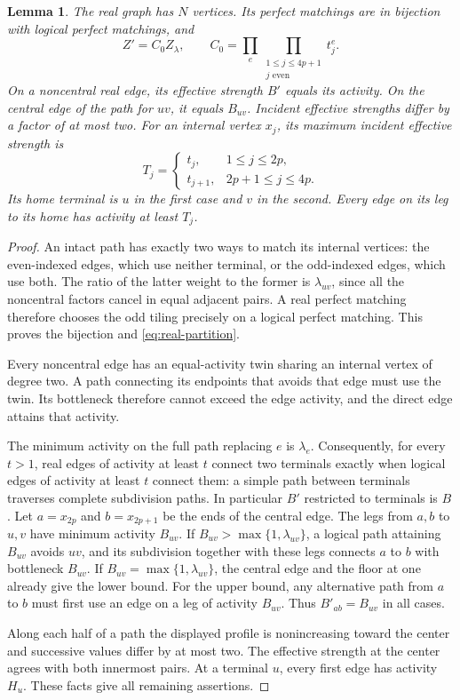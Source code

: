 \documentclass[11pt]{article}
\newtheorem{lemma}[theorem]{Lemma}
\theoremstyle{definition}
\theoremstyle{remark}
\numberwithin{equation}{section}
\begin{document}
\begin{lemma}\label{lem:subdivision}
The real graph has $N$ vertices. Its perfect matchings are in
bijection with logical perfect matchings, and
\begin{equation}\label{eq:real-partition}
 Z'=C_0 Z_\lambda,
 \qquad
 C_0=\prod_e\prod_{\substack{1\le j\le4p+1\\j\text{ even}}}t_j^e.
\end{equation}
On a noncentral real edge, its effective strength $B'$ equals its
activity. On the central edge of the path for $uv$, it equals
$B_{uv}$. Incident effective strengths differ by a factor of at most
two. For an internal vertex $x_j$, its maximum incident effective
strength is
\[
 T_j=
 \begin{cases}
 t_j,&1\le j\le2p,\\
 t_{j+1},&2p+1\le j\le4p.
 \end{cases}
\]
Its \emph{home terminal} is $u$ in the first case and $v$ in the
second. Every edge on its leg to its home has activity at least $T_j$.
\end{lemma}

\begin{proof}
An intact path has exactly two ways to match its internal vertices:
the even-indexed edges, which use neither terminal, or the
odd-indexed edges, which use both. The ratio of the latter weight to
the former is $\lambda_{uv}$, since all the noncentral factors cancel
in equal adjacent pairs. A real perfect matching therefore chooses
the odd tiling precisely on a logical perfect matching. This proves
the bijection and \cref{eq:real-partition}.

Every noncentral edge has an equal-activity twin sharing an internal
vertex of degree two. A path connecting its endpoints that avoids
that edge must use the twin. Its bottleneck therefore cannot exceed
the edge activity, and the direct edge attains that activity.

The minimum activity on the full path replacing $e$ is $\lambda_e$.
Consequently, for every $t>1$, real edges of activity at least $t$
connect two terminals exactly when logical edges of activity at least
$t$ connect them: a simple path between terminals traverses complete
subdivision paths. In particular $B'$ restricted to terminals is $B$.
Let $a=x_{2p}$ and $b=x_{2p+1}$ be the ends of the central edge.
The legs from $a,b$ to $u,v$ have minimum activity $B_{uv}$.
If $B_{uv}>\max\{1,\lambda_{uv}\}$, a logical path attaining
$B_{uv}$ avoids $uv$, and its subdivision together with these legs
connects $a$ to $b$ with bottleneck $B_{uv}$. If
$B_{uv}=\max\{1,\lambda_{uv}\}$, the central edge and the floor at
one already give the lower bound. For the upper bound, any
alternative path from $a$ to $b$ must first use an edge on a leg
of activity $B_{uv}$. Thus $B'_{ab}=B_{uv}$ in all cases.

Along each half of a path the displayed profile is nonincreasing
toward the center and successive values differ by at most two.
The effective strength at the center agrees with both innermost
pairs. At a terminal $u$, every first edge has activity $H_u$.
These facts give all remaining assertions.
\end{proof}
\end{document}

